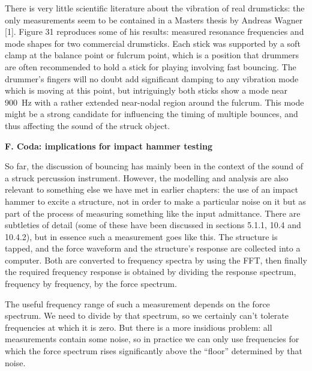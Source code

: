   There is very little scientific literature about the vibration of real 
  drumsticks: the only measurements seem to be contained in a Masters thesis by 
  Andreas Wagner [1]. Figure 31 reproduces some of his results: measured 
  resonance frequencies and mode shapes for two commercial drumsticks. Each 
  stick was supported by a soft clamp at the balance point or fulcrum point, 
  which is a position that drummers are often recommended to hold a stick for 
  playing involving fast bouncing. The drummer’s fingers will no doubt add 
  significant damping to any vibration mode which is moving at this point, but 
  intriguingly both sticks show a mode near 900~Hz with a rather extended 
  near-nodal region around the fulcrum. This mode might be a strong candidate 
  for influencing the timing of multiple bounces, and thus affecting the sound 
  of the struck object. 


  \textbf{F. Coda: implications for impact hammer testing} 

  So far, the discussion of bouncing has mainly been in the context of the 
  sound of a struck percussion instrument. However, the modelling and analysis 
  are also relevant to something else we have met in earlier chapters: the use 
  of an impact hammer to excite a structure, not in order to make a particular 
  noise on it but as part of the process of measuring something like the input 
  admittance. There are subtleties of detail (some of these have been discussed 
  in sections 5.1.1, 10.4 and 10.4.2), but in essence such a measurement goes 
  like this. The structure is tapped, and the force waveform and the 
  structure’s response are collected into a computer. Both are converted to 
  frequency spectra by using the FFT, then finally the required frequency 
  response is obtained by dividing the response spectrum, frequency by 
  frequency, by the force spectrum. 

  The useful frequency range of such a measurement depends on the force 
  spectrum. We need to divide by that spectrum, so we certainly can’t tolerate 
  frequencies at which it is zero. But there is a more insidious problem: all 
  measurements contain some noise, so in practice we can only use frequencies 
  for which the force spectrum rises significantly above the “floor” determined 
  by that noise. 

